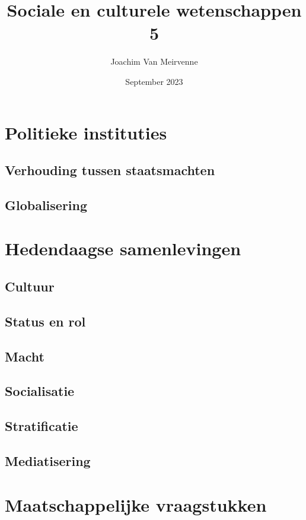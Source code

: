 \documentclass[a4paper,12pt, dutch, oneside ]{book}
\begin{document}
\author{Joachim Van Meirvenne}
\title{Sociale en culturele wetenschappen 5}
\date{September 2023}

\frontmatter
\maketitle
\tableofcontents

\mainmatter

\part{Politieke instituties}


\chapter{Verhouding tussen staatsmachten}
\chapter{Globalisering}

\part{Hedendaagse samenlevingen}
\chapter{Cultuur}
\chapter{Status en rol}
\chapter{Macht}
\chapter{Socialisatie}
\chapter{Stratificatie}
\chapter{Mediatisering}

\part{Maatschappelijke vraagstukken}

%


\end{document}
